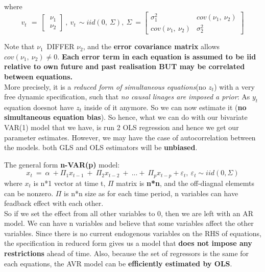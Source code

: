 \documentclass[12pt]{article}
\begin{document}
where
\begin{equation}
v_{t\ }\ =\ \left[\ \begin{matrix}\nu_1\\\nu_2\end{matrix}\right]\ ,\ v_{t\ }\sim iid\left(0,\ \Sigma\right),\ \Sigma\ =\left[\begin{matrix}\sigma_1^2&cov\left(\nu_1,\ \nu_2\right)\\cov\left(\nu_1,\ \nu_2\right)&\sigma_2^2\end{matrix}\right]
\end{equation}

\noindent
Note that $\nu_{1\ }$ DIFFER $\nu_2$, and the \textbf{error covariance matrix} allows $cov\left(\nu _1,\ \nu _2\right) \ne 0$. \textbf{Each error term in each equation is assumed to be iid relative to own future and past realisation BUT may be correlated between equations.}
\\

More precisely, it is a \textit{reduced form of simultaneous equations}(no $z_t$) with a very free dynamic specification, such that \textit{no causal linages are imposed a prior}: As $y_t$ equation doesnot have $z_t$ inside of it anymore. So we can now estimate it (\textbf{no simultaneous equation bias}). So hence, what we can do with our bivariate VAR(1) model that we have, is run 2 OLS regression and hence we get our parameter estimates. However, we may have the case of autocorrelation between the models. both GLS and OLS estimators will be \textbf{unbiased}.

The general form  \textbf{n-VAR(p)} model:\\
\begin{equation}
x_t\ =\ \alpha \ +\Pi _1x_{t-1}\ +\ \Pi _2x_{t-2}\ +\ ...+\ \Pi _px_{t-p}+\varepsilon _t,\ \varepsilon _t\sim iid\left(0,\Sigma \right)
\end{equation}
where $x_t$ is n*1 vector at time t, $\Pi$ matrix is \textbf{n*n}, and the off-diagnal elememts can be nonzero. $\Pi$ is n*n size as for each time period, n variables can have feadback effect with each other.
\\

So if we set the effect from all other variables to 0, then we are left with an AR model. We can have n variables and believe that some variables affect the other variables. Since there is no current endogenous variables on the RHS of equations, the specification in reduced form gives us a model that \textbf{does not impose any restrictions} ahead of time. Also, because the set of regressors is the same for each equations, the AVR model can be \textbf{efficiently estimated by OLS}.
\\
\end{document}
